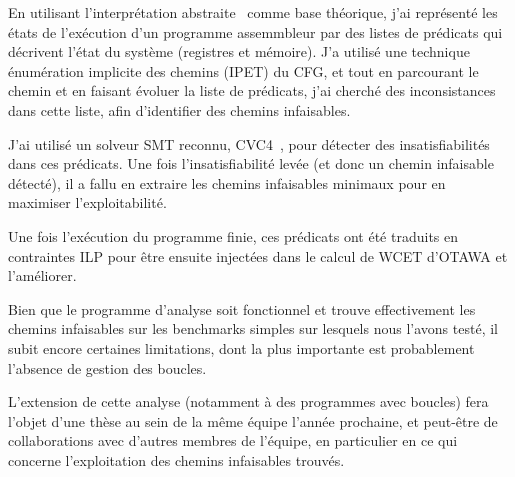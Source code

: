 \documentclass[french]{article}
\begin{document}
  En utilisant l'interprétation abstraite~\cite{cousot} comme base théorique, j'ai représenté les états de l'exécution d'un programme assemmbleur par des listes de prédicats qui décrivent l'état du système (registres et mémoire). J'a utilisé une technique énumération implicite des chemins (IPET) du CFG, et tout en parcourant le chemin et en faisant évoluer la liste de prédicats, j'ai cherché des inconsistances dans cette liste, afin d'identifier des chemins infaisables.
  
  J'ai utilisé un solveur SMT reconnu, CVC4~\cite{smt_cvc4}, pour détecter des insatisfiabilités dans ces prédicats. Une fois l'insatisfiabilité levée (et donc un chemin infaisable détecté), il a fallu en extraire les chemins infaisables minimaux pour en maximiser l'exploitabilité.
  
  Une fois l'exécution du programme finie, ces prédicats ont été traduits en contraintes ILP pour être ensuite injectées dans le calcul de WCET d'OTAWA et l'améliorer.
  
  Bien que le programme d'analyse soit fonctionnel et trouve effectivement les chemins infaisables sur les benchmarks simples sur lesquels nous l'avons testé, il subit encore certaines limitations, dont la plus importante est probablement l'absence de gestion des boucles.
  
  L'extension de cette analyse (notamment à des programmes avec boucles) fera l'objet d'une thèse au sein de la même équipe l'année prochaine, et peut-être de collaborations avec d'autres membres de l'équipe, en particulier en ce qui concerne l'exploitation des chemins infaisables trouvés.
\end{document}

